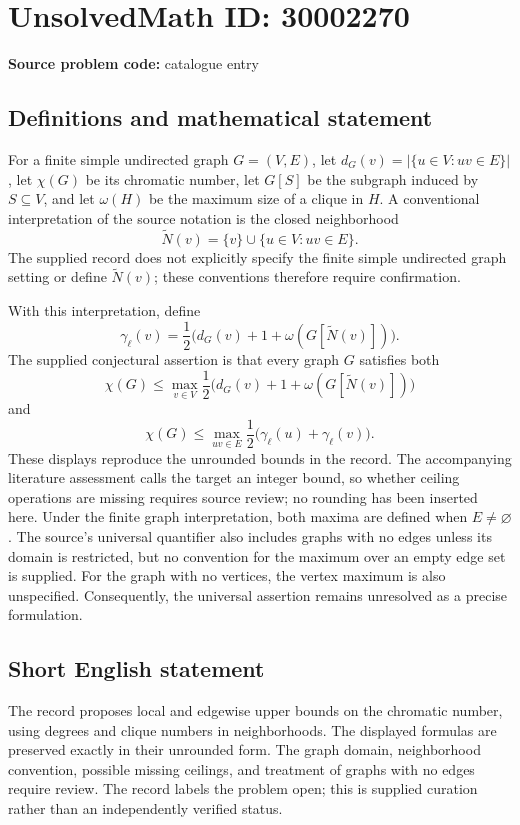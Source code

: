 \documentclass[11pt]{article}
\begin{document}
\section*{UnsolvedMath ID: 30002270}
\textbf{Source problem code:} catalogue entry
\subsection{Definitions and mathematical statement}
For a finite simple undirected graph \(G=(V,E)\), let \(d_G(v)=|\{u\in V:uv\in E\}|\), let \(\chi(G)\) be its chromatic number, let \(G[S]\) be the subgraph induced by \(S\subseteq V\), and let \(\omega(H)\) be the maximum size of a clique in \(H\). A conventional interpretation of the source notation is the closed neighborhood
\[
\widetilde N(v)=\{v\}\cup\{u\in V:uv\in E\}.
\]
The supplied record does not explicitly specify the finite simple undirected graph setting or define \(\widetilde N(v)\); these conventions therefore require confirmation.

With this interpretation, define
\[
\gamma_\ell(v)=\frac12\bigl(d_G(v)+1+\omega(G[\widetilde N(v)])\bigr).
\]
The supplied conjectural assertion is that every graph \(G\) satisfies both
\[
\chi(G)\leq\max_{v\in V}\frac12\bigl(d_G(v)+1+\omega(G[\widetilde N(v)])\bigr)
\]
and
\[
\chi(G)\leq\max_{uv\in E}\frac12\bigl(\gamma_\ell(u)+\gamma_\ell(v)\bigr).
\]
These displays reproduce the unrounded bounds in the record. The accompanying literature assessment calls the target an integer bound, so whether ceiling operations are missing requires source review; no rounding has been inserted here. Under the finite graph interpretation, both maxima are defined when \(E\ne\varnothing\). The source's universal quantifier also includes graphs with no edges unless its domain is restricted, but no convention for the maximum over an empty edge set is supplied. For the graph with no vertices, the vertex maximum is also unspecified. Consequently, the universal assertion remains unresolved as a precise formulation.
\subsection{Short English statement}
The record proposes local and edgewise upper bounds on the chromatic number, using degrees and clique numbers in neighborhoods. The displayed formulas are preserved exactly in their unrounded form. The graph domain, neighborhood convention, possible missing ceilings, and treatment of graphs with no edges require review. The record labels the problem open; this is supplied curation rather than an independently verified status.
\end{document}

